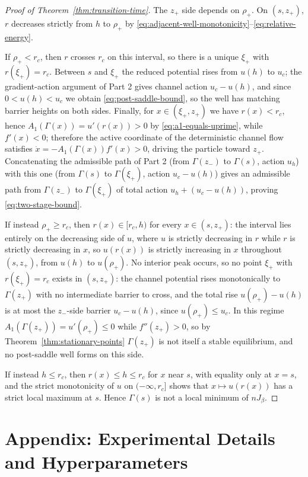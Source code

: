 \documentclass{article}
\theoremstyle{plain}
\theoremstyle{definition}
\theoremstyle{remark}
\newcommand{\prefactor}[2]{A_{#1}(#2)}
\begin{document}
\begin{proof}[Proof of Theorem~\ref{thm:transition-time}]
    The $z_+$ side depends on $\rho_+$. On $(s,z_+)$, $r$ decreases strictly from $h$ to $\rho_+$ by \eqref{eq:adjacent-well-monotonicity}--\eqref{eq:relative-energy}.

    If $\rho_+<r_c$, then $r$ crosses $r_c$ on this interval, so there is a unique $\xi_+$ with $r(\xi_+)=r_c$. Between $s$ and $\xi_+$ the reduced potential rises from $u(h)$ to $u_c$; the gradient-action argument of Part 2 gives channel action $u_c-u(h)$, and since $0<u(h)<u_c$ we obtain \eqref{eq:post-saddle-bound}, so the well has matching barrier heights on both sides. Finally, for $x\in(\xi_+,z_+)$ we have $r(x)<r_c$, hence $\prefactor{1}{\Gamma(x)}=u'(r(x))>0$ by \eqref{eq:a1-equals-uprime}, while $f'(x)<0$; therefore the active coordinate of the deterministic channel flow satisfies $\dot x=-\prefactor{1}{\Gamma(x)}f'(x)>0$, driving the particle toward $z_+$. Concatenating the admissible path of Part 2 (from $\Gamma(z_-)$ to $\Gamma(s)$, action $u_h$) with this one (from $\Gamma(s)$ to $\Gamma(\xi_+)$, action $u_c-u(h)$) gives an admissible path from $\Gamma(z_-)$ to $\Gamma(\xi_+)$ of total action $u_h+(u_c-u(h))$, proving \eqref{eq:two-stage-bound}.

    If instead $\rho_+\ge r_c$, then $r(x)\in[r_c,h)$ for every $x\in(s,z_+)$: the interval lies entirely on the decreasing side of $u$, where $u$ is strictly decreasing in $r$ while $r$ is strictly decreasing in $x$, so $u(r(x))$ is strictly increasing in $x$ throughout $(s,z_+)$, from $u(h)$ to $u(\rho_+)$. No interior peak occurs, so no point $\xi_+$ with $r(\xi_+)=r_c$ exists in $(s,z_+)$: the channel potential rises monotonically to $\Gamma(z_+)$ with no intermediate barrier to cross, and the total rise $u(\rho_+)-u(h)$ is at most the $z_-$-side barrier $u_c-u(h)$, since $u(\rho_+)\le u_c$. In this regime $\prefactor{1}{\Gamma(z_+)}=u'(\rho_+)\le0$ while $f''(z_+)>0$, so by Theorem~\ref{thm:stationary-points} $\Gamma(z_+)$ is not itself a stable equilibrium, and no post-saddle well forms on this side.

    If instead $h\le r_c$, then $r(x)\le h\le r_c$ for $x$ near $s$, with equality only at $x=s$, and the strict monotonicity of $u$ on $(-\infty,r_c]$ shows that $x\mapsto u(r(x))$ has a strict local maximum at $s$. Hence $\Gamma(s)$ is not a local minimum of $nJ_\beta$.
\end{proof}


\section{Appendix: Experimental Details and Hyperparameters}
\label{app:hyperparameters}
\end{document}
